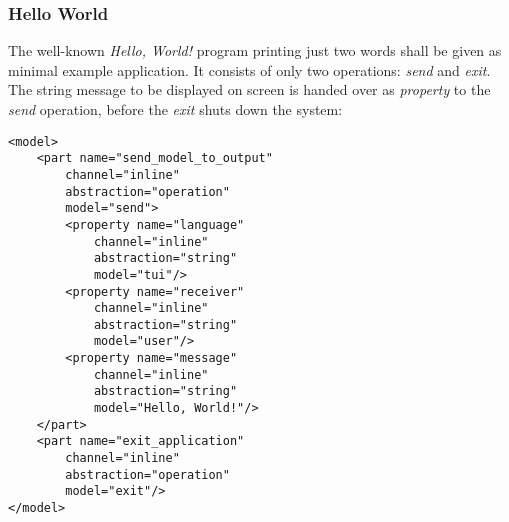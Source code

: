%
%
%
%
%
%
%

\subsubsection{Hello World}
\label{hello_world_heading}

The well-known \emph{Hello, World!} program printing just two words shall be
given as minimal example application. It consists of only two operations:
\emph{send} and \emph{exit}. The string message to be displayed on screen is
handed over as \emph{property} to the \emph{send} operation, before the
\emph{exit} shuts down the system:

\begin{scriptsize}
    \begin{verbatim}
<model>
    <part name="send_model_to_output"
        channel="inline"
        abstraction="operation"
        model="send">
        <property name="language"
            channel="inline"
            abstraction="string"
            model="tui"/>
        <property name="receiver"
            channel="inline"
            abstraction="string"
            model="user"/>
        <property name="message"
            channel="inline"
            abstraction="string"
            model="Hello, World!"/>
    </part>
    <part name="exit_application"
        channel="inline"
        abstraction="operation"
        model="exit"/>
</model>
    \end{verbatim}
\end{scriptsize}
